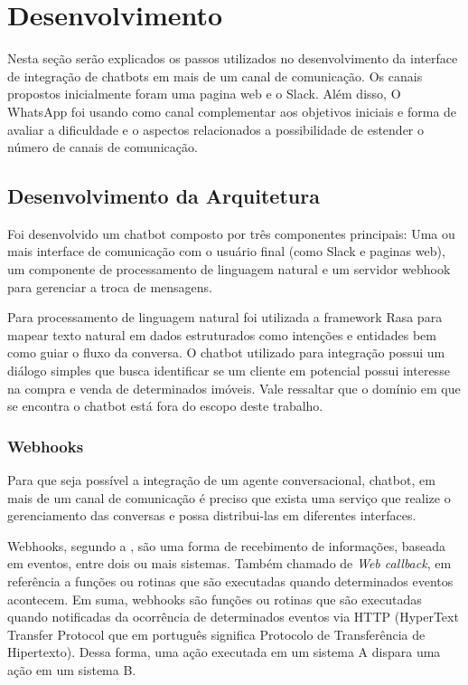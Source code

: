 

\chapter{Desenvolvimento}
Nesta seção serão explicados os passos utilizados no desenvolvimento da interface de integração de chatbots em mais de um canal de comunicação. Os canais propostos inicialmente foram uma pagina web e o Slack. Além disso, O WhatsApp foi usando como canal complementar aos objetivos iniciais e forma de avaliar a dificuldade e o aspectos relacionados a possibilidade de estender o número de canais de comunicação.



\section{Desenvolvimento da Arquitetura}

Foi desenvolvido um chatbot composto por três componentes principais: Uma ou mais interface de comunicação com o usuário final (como Slack e paginas web), um componente de processamento de linguagem natural e um servidor webhook para gerenciar a troca de mensagens. 

Para processamento de linguagem natural foi utilizada a framework Rasa para mapear texto natural em dados estruturados como intenções e entidades bem como guiar o fluxo da conversa. O chatbot utilizado para integração possui um diálogo simples que busca identificar se um cliente em potencial possui interesse na compra e venda de determinados imóveis. Vale ressaltar que o  domínio em que se encontra o chatbot está fora do escopo deste trabalho.

\subsection{Webhooks}
Para que seja possível a integração de um agente conversacional, chatbot, em mais de um canal de comunicação é preciso que exista uma serviço que realize o gerenciamento das conversas e possa distribui-las em diferentes interfaces.

Webhooks, segundo a , são uma forma de recebimento de informações, baseada em eventos, entre dois ou mais sistemas. Também chamado de \textit{Web callback}, em referência a funções ou rotinas que são executadas quando determinados eventos acontecem. Em suma,  webhooks são funções ou rotinas que são executadas quando notificadas da ocorrência de determinados eventos via HTTP (HyperText Transfer Protocol que em português significa Protocolo de Transferência de Hipertexto). Dessa forma, uma ação executada em um sistema A dispara uma ação em um sistema B.

